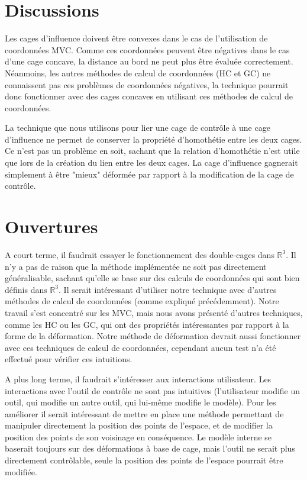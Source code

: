 \section{Discussions}

Les cages d'influence doivent être convexes dans le cas de l'utilisation de
coordonnées MVC. Comme ces coordonnées peuvent être négatives dans le cas
d'une cage concave, la distance au bord ne peut plus être évaluée
correctement. Néanmoins, les autres méthodes de calcul de coordonnées (HC et
GC) ne connaissent pas ces problèmes de coordonnées négatives, la technique
pourrait donc fonctionner avec des cages concaves en utilisant ces méthodes de
calcul de coordonnées.

La technique que nous utilisons pour lier une cage de contrôle à une cage
d'influence ne permet de conserver la propriété d'homothétie entre les deux
cages. Ce n'est pas un problème en soit, sachant que la relation d'homothétie
n'est utile que lors de la création du lien entre les deux cages. La cage
d'influence gagnerait simplement à être "mieux" déformée par rapport à la
modification de la cage de contrôle.

\section{Ouvertures}

A court terme, il faudrait essayer le fonctionnement des double-cages dans
$\mathbb{R}^3$. Il n'y a pas de raison que la méthode implémentée ne soit pas
directement généralisable, sachant qu'elle se base sur des calculs de
coordonnées qui sont bien définis dans $\mathbb{R}^3$. Il serait intéressant
d'utiliser notre technique avec d'autres méthodes de calcul de coordonnées
(comme expliqué précédemment). Notre travail s'est concentré sur les MVC, mais
nous avons présenté d'autres techniques, comme les HC ou les GC, qui ont des
propriétés intéressantes par rapport à la forme de la déformation. Notre
méthode de déformation devrait aussi fonctionner avec ces techniques de calcul
de coordonnées, cependant aucun test n'a été effectué pour vérifier ces
intuitions.

A plus long terme, il faudrait s'intéresser aux interactions utilisateur. Les
interactions avec l'outil de contrôle ne sont pas intuitives (l'utilisateur
modifie un outil, qui modifie un autre outil, qui lui-même modifie le modèle).
Pour les améliorer il serait intéressant de mettre en place une méthode
permettant de manipuler directement la position des points de l'espace, et de
modifier la position des points de son voisinage en conséquence. Le modèle
interne se baserait toujours sur des déformations à base de cage, mais l'outil
ne serait plus directement contrôlable, seule la position des points de
l'espace pourrait être modifiée.
